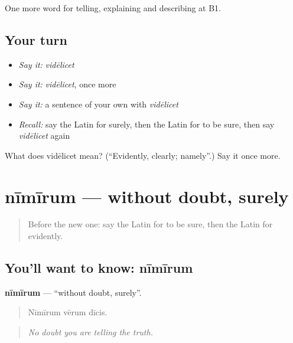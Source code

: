 \begin{grammarlens}[title={What you've built}]
One more word for telling, explaining and describing at B1.
\end{grammarlens}

\subsection*{Your turn}
\begin{itemize}
\raggedright
  \item \emph{Say it:} \emph{vidēlicet}
  \item \emph{Say it:} \emph{vidēlicet}, once more
  \item \emph{Say it:} a sentence of your own with \emph{vidēlicet}
  \item \emph{Recall:} say the Latin for surely, then the Latin for to be sure, then say \emph{vidēlicet} again
\end{itemize}

\begin{tcolorbox}[breakable,colback=teal!4,colframe=teal!35!black,title={Before you move on}]
What does vidēlicet mean? (\textquotedblleft{}Evidently, clearly; namely\textquotedblright{}.) Say it once more.
\end{tcolorbox}
\section[nīmīrum]{nīmīrum — without doubt, surely}

\label{lesson:LA-C366-nimirum}



\begin{quote}
Before the new one: say the Latin for to be sure, then the Latin for evidently.
\end{quote}

\subsection*{You'll want to know: nīmīrum}
\textbf{nīmīrum} — \textquotedblleft{}without doubt, surely\textquotedblright{}.

\begin{quote}
Nīmīrum vērum dīcis.
\end{quote}

\begin{quote}
\emph{No doubt you are telling the truth.}
\end{quote}

